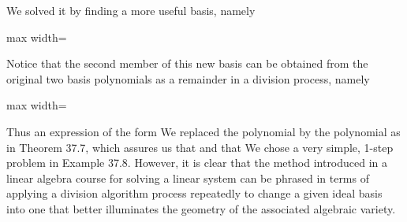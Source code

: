 \documentclass[11pt,oneside]{article}
\begin{document}
\BookNarrativetrue

\begin{BookBody}

\noindent We solved it by finding a more useful basis, namely

\begin{center}\begin{adjustbox}{max width=\linewidth}\end{adjustbox}\end{center}

\noindent Notice that the second member of this new basis can be obtained from the original two basis polynomials as a remainder  in a division process, namely

\begin{center}\begin{adjustbox}{max width=\linewidth}\end{adjustbox}\end{center}

\noindent Thus  an expression of the form  We replaced the polynomial  by the polynomial  as in Theorem 37.7, which assures us that  and that  We chose a very simple, 1-step problem in Example 37.8. However, it is clear that the method introduced in a linear algebra course for solving a linear system can be phrased in terms of applying a division algorithm process repeatedly to change a given ideal basis into one that better illuminates the geometry of the associated algebraic variety.



\end{BookBody}
\end{document}
